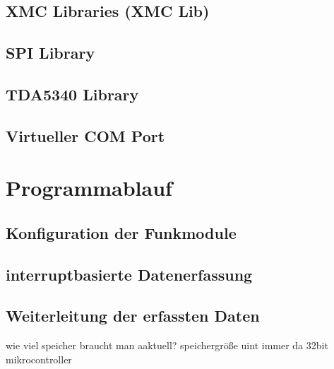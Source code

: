 \subsection{XMC Libraries (XMC Lib)}
\subsection{SPI Library}
\subsection{TDA5340 Library}
\subsection{Virtueller COM Port}
\section{Programmablauf}
\subsection{Konfiguration der Funkmodule}
\subsection{interruptbasierte Datenerfassung}
\subsection{Weiterleitung der erfassten Daten}
wie viel speicher braucht man aaktuell?
speichergröße uint immer da 32bit mikrocontroller